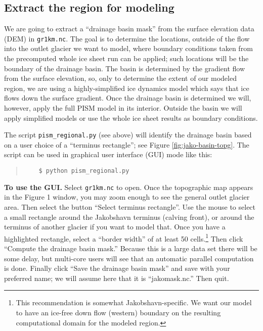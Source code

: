 \subsection*{Extract the region for modeling}
We are going to extract a ``drainage basin mask'' from the surface elevation data (DEM) in \texttt{gr1km.nc}.  The goal is to determine the locations, outside of the flow into the outlet glacier we want to model, where boundary conditions taken from the precomputed whole ice sheet run can be applied; such locations will be the boundary of the drainage basin.  The basin is determined by the gradient flow from the surface elevation, so, only to determine the extent of our modeled region, we are using a highly-simplified ice dynamics model which says that ice flows down the surface gradient.  Once the drainage basin is determined we will, however, apply the full PISM model in its interior.  Outside the basin we will apply simplified models or use the whole ice sheet results as boundary conditions.

The script \texttt{pism_regional.py} (see above) will identify the drainage basin based on a user choice of a ``terminus rectangle''; see Figure \ref{fig:jako-basin-topg}.  The script can be used in graphical user interface (GUI) mode like this:
\begin{quote}\small
\begin{verbatim}
    $ python pism_regional.py
\end{verbatim}
\normalsize\end{quote}

\noindent\textbf{To use the GUI.}  Select \texttt{gr1km.nc} to open.  Once the topographic map appears in the Figure 1 window, you may zoom enough to see the general outlet glacier area.  Then select the button ``Select terminus rectangle''.  Use the mouse to select a small rectangle around the Jakobshavn terminus (calving front), or around the terminus of another glacier if you want to model that.  Once you have a highlighted rectangle, select a ``border width'' of at least 50 cells.\footnote{This recommendation is somewhat Jakobshavn-specific. We want our model to have an ice-free down flow (western) boundary on the resulting computational domain for the modeled region.}  Then click ``Compute the drainage basin mask.''  Because this is a large data set there will be some delay, but multi-core users will see that an automatic parallel computation is done.  Finally click ``Save the drainage basin mask'' and save with your preferred name; we will assume here that it is ``jakomask.nc.''  Then quit.


